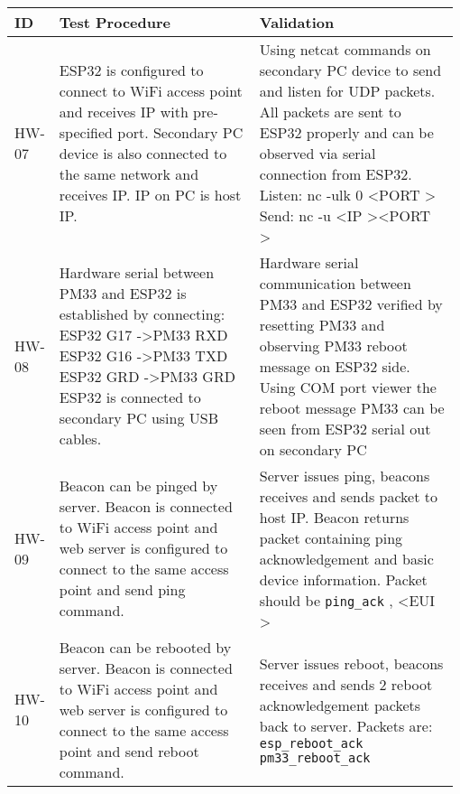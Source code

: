 \pagebreak
\
\bgroup
\def\arraystretch{1.3}
\begin{table}[h!]
    \centering
    \begin{tabular}{|p{0.075\linewidth}|p{0.45\linewidth}|p{0.45\linewidth}|} 
    \hline
    ID & Test Procedure & Validation\\ 

    \hline  
    HW-07
	& ESP32 is configured to connect to WiFi access point and receives IP with pre-specified port. Secondary PC device is also connected to the same network and receives IP. IP on PC is host IP.
	& Using netcat commands on secondary PC device to send and listen for UDP packets.
	All packets are sent to ESP32 properly and can be observed via serial connection from ESP32.\newline
	Listen: nc -ulk 0 \textless PORT \textgreater \newline
	Send: nc -u \textless IP \textgreater \textless PORT \textgreater \\
     
    \hline  
    HW-08
	& Hardware serial between PM33 and ESP32 is established by connecting: \newline
	ESP32 G17 -\textgreater PM33 RXD \newline
	ESP32 G16 -\textgreater PM33 TXD \newline
	ESP32 GRD -\textgreater PM33 GRD \newline
	ESP32 is connected to secondary PC using USB cables.
	& Hardware serial communication between PM33 and ESP32 verified by resetting PM33 and observing PM33 reboot message on ESP32 side. Using COM port viewer the reboot message PM33 can be seen from ESP32 serial out on secondary PC\\

	\hline  
	HW-09
	& Beacon can be pinged by server. Beacon is connected to WiFi access point and web server is configured to connect to the same access point and send ping command.
	& Server issues ping, beacons receives and sends packet to host IP. Beacon returns packet containing ping acknowledgement and basic device information.
	Packet should be \texttt{ping\_ack} , \textless EUI \textgreater\\
	
	\hline
	HW-10
	& Beacon can be rebooted by server. Beacon is connected to WiFi access point and web server is configured to connect to the same access point and send reboot command.
	& Server issues reboot, beacons receives and sends 2 reboot acknowledgement  packets back to server. Packets are:
	\texttt{esp\_reboot\_ack}  \newline
	\texttt{pm33\_reboot\_ack}  \\
	

\end{tabular}
\end{table}

